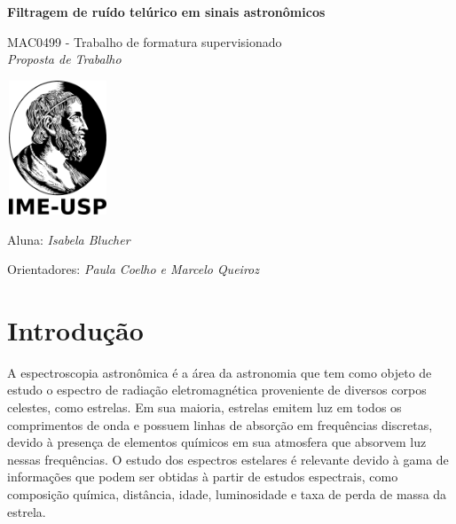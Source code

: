 \documentclass[11pt,twoside,a4paper]{article}
\begin{document}
\begin{center}
  \vspace*{3cm}
  
  \Huge
  \textbf{Filtragem de ruído telúrico em sinais astronômicos}

  \vspace{2.5cm}
  \LARGE
  MAC0499 - Trabalho de formatura supervisionado\\
  \vspace{0.3cm}
  \LARGE
  \textit{Proposta de Trabalho}

  
  \vspace{4.3cm}
  \includegraphics[height=4cm,width=3cm]{ime.png}
  \vspace{2cm}
  
  Aluna: \textit{Isabela Blucher}
  
  
  Orientadores: \textit{Paula Coelho e Marcelo Queiroz}
  
  \vspace{0.8cm}
  
  \Large
  
\end{center}


\newpage
\tableofcontents
\newpage
\section{Introdução}
\doublespacing


A espectroscopia astronômica é a área da astronomia que tem como objeto de estudo o espectro de radiação eletromagnética proveniente de diversos corpos celestes, como estrelas. Em sua maioria, estrelas emitem luz em todos os comprimentos de onda e possuem linhas de absorção em frequências discretas, devido à presença de elementos químicos em sua atmosfera que absorvem luz nessas frequências. O estudo dos espectros estelares é relevante devido à gama de informações que podem ser obtidas à partir de estudos espectrais, como composição química, distância, idade, luminosidade e taxa de perda de massa da estrela\cite{wiki:astro_spectroscopy}.
\end{document}
